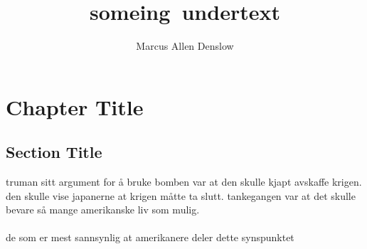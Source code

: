 \documentclass{report}
\title{\Huge{someing}\ undertext}
\author{\Huge{Marcus Allen Denslow}}
\date{}
\begin{document}
\maketitle
\newpage%
\tableofcontents
\pagebreak

\chapter{Chapter Title}
\section{Section Title}


truman sitt argument for å bruke bomben var at den skulle kjapt avskaffe krigen. den skulle vise japanerne at 
krigen måtte ta slutt. tankegangen var at det skulle bevare så mange amerikanske liv som mulig.
\\
\\
de som er mest sannsynlig at amerikanere deler dette synspunktet
\end{document}
